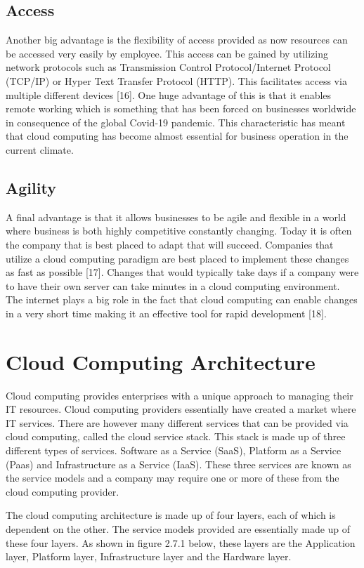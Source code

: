 \documentclass[oneside,12pt]{Classes/RoboticsLaTeX}
\begin{document}
\subsection{Access}
Another big advantage is the flexibility of access provided as now resources can be accessed very easily by employee. This access can be gained by utilizing network protocols such as Transmission Control Protocol/Internet Protocol (TCP/IP) or Hyper Text Transfer Protocol (HTTP). This facilitates access via multiple different devices [16]. One huge advantage of this is that it enables remote working which is something that has been forced on businesses worldwide in consequence of the global Covid-19 pandemic. This characteristic has meant that cloud computing has become almost essential for business operation in the current climate. 

\subsection{Agility}
A final advantage is that it allows businesses to be agile and flexible in a world where business is both highly competitive constantly changing. Today it is often the company that is best placed to adapt that will succeed. Companies that utilize a cloud computing paradigm are best placed to implement these changes as fast as possible [17]. Changes that would typically take days if a company were to have their own server can take minutes in a cloud computing environment. The internet plays a big role in the fact that cloud computing can enable changes in a very short time making it an effective tool for rapid development [18].    

\section{Cloud Computing Architecture}
Cloud computing provides enterprises with a unique approach to managing their IT resources. Cloud computing providers essentially have created a market where IT services. There are however many different services that can be provided via cloud computing, called the cloud service stack. This stack is made up of three different types of services. Software as a Service (SaaS), Platform as a Service (Paas) and Infrastructure as a Service (IaaS). These three services are known as the service models and a company may require one or more of these from the cloud computing provider. 

The cloud computing architecture is made up of four layers, each of which is dependent on the other. The service models provided are essentially made up of these four layers. As shown in figure 2.7.1 below, these layers are the Application layer, Platform layer, Infrastructure layer and the Hardware layer. 
\end{document}
